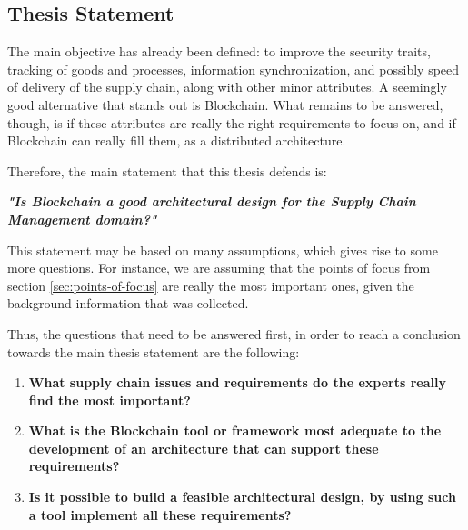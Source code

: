\subsection{Thesis Statement}
\label{subsec:thesis-statement}
The main objective has already been defined: to improve the security traits, tracking of goods and processes, information synchronization, and possibly speed of delivery of the supply chain, along with other minor attributes. A seemingly good alternative that stands out is Blockchain. What remains to be answered, though, is if these attributes are really the right requirements to focus on, and if Blockchain can really fill them, as a distributed architecture.


Therefore, the main statement that this thesis defends is: 

\par \textbf{\textit{"Is Blockchain a good architectural design for the Supply Chain Management domain?"}}


This statement may be based on many assumptions, which gives rise to some more questions. For instance, we are assuming that the points of focus from section \ref{sec:points-of-focus} are really the most important ones, given the background information that was collected.

Thus, the questions that need to be answered first, in order to reach a conclusion towards the main thesis statement are the following:
\begin{enumerate}
\item \textbf{What supply chain issues and requirements do the experts really find the most important?}
\item \textbf{What is the Blockchain tool or framework most adequate to the development of an architecture that can support these requirements?}
\item \textbf{Is it possible to build a feasible architectural design, by using such a tool implement all these requirements?}
\end{enumerate}

